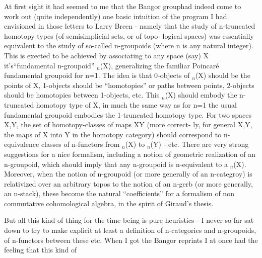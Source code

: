 At first sight it had seemed to me that the Bangor group\hand{/}had indeed
come to work out (quite independently) one basic intuition of the program
I had envisioned in those letters to Larry Breen  -  namely that the
study of n-truncated homotopy types (of semisimplicial sets,  or of topo-%
logical spaces) was essentially equivalent to the study of so-called
n-groupoids (where n is any natural integer). This is exected to be
achieved by associating to any space (say) X it's\hand{|}``fundamental n-groupoid''
\hand{$\Pi$}$_n$(X),  generalizing the familiar Poincar\'e fundamental groupoid for n=1.
The  idea is that 0-objects of \hand{$\Pi$}$_n$(X) should be the points of X,
1-objects should be ``homotopies'' or paths between points,  2-objects
should be homotopies between 1-objects, etc.  This \hand{$\Pi$}$_n$(X)  should embody
the n-truncated homotopy type of X, in much the same way as for n=1 the
usual fundamental groupoid embodies the 1-truncated homotopy type.  For
two spaces X,Y,  the set of homotopy-classes of maps X\hand{$\to$}Y (more correct-%
ly, for general X,Y,  the maps of X into Y in the homotopy category)
should correspond to n-equivalence classes of n-functors from \hand{$\Pi$}$_n$(X) to
\hand{$\Pi$}$_n$(Y)  -  etc.  There are very stro\hand{$\frown$}ng  suggestions for a nice formalism,
including a notion of geometric realization of an n-groupoid,  which
should imply that any n-groupoid is n-equivalent to a \hand{$\Pi$}$_n$(X).  Moreover,
when the notion of n-groupoid (or more generally of an n-categroy) is
relativized over an arbitrary topos to the notion of an n-gerb (or more
generally, an n-stack), these become the  natural ``coefficients'' for
a formalism of non commutative cohomological algebra,  in the spirit of
Giraud's thesis.

But all this kind of thing for the time being is pure heuristics
-  I never so far sat down to try to make explicit at least a definition
of n-categories and n-groupoids,  of n-functors between these etc.  When
I got the Bangor reprints I at once had the feeling that this kind of 

